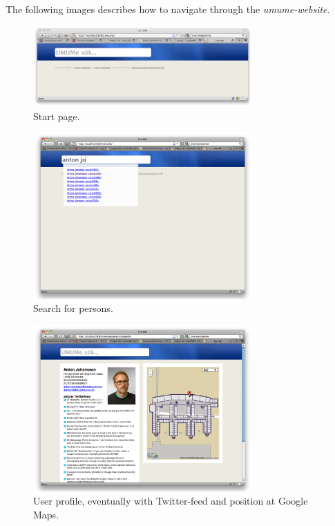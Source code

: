 \documentclass[titlepage, twocolumn, a4paper, 10pt]{article}
\begin{document}
The following images describes how to navigate through 
the \textit{umume-website}.

\begin{figure}[!thb]
  \centering
  \includegraphics[width=3.3in]{images/pic1.png}
  \caption{Start page.}
  \label{fig:images/startpage}
\end{figure}

\begin{figure}[!thb]
  \centering
  \includegraphics[width=3.3in]{images/pic2.png}
  \caption{Search for persons.}
  \label{fig:images/search}
\end{figure}

\begin{figure}[!thb]
  \centering
  \includegraphics[width=3.3in]{images/pic3.png}
  \caption{User profile, eventually with Twitter-feed and position at Google Maps.}
  \label{fig:images/person}
\end{figure}
\end{document}
